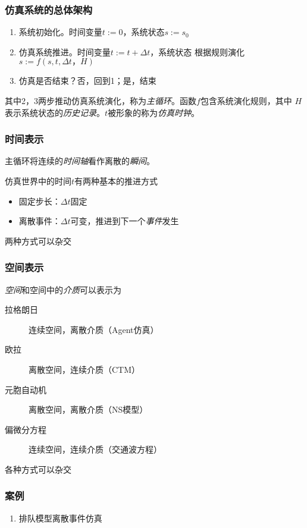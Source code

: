 \documentclass[14pt]{beamer}
\begin{document}
\begin{frame}
    \frametitle{仿真系统的总体架构}
    \begin{enumerate}
        \item 系统初始化。时间变量$t:=0$，系统状态$s:=s_0$
        \item 仿真系统推进。时间变量$t:=t+\Delta t$，系统状态
        根据规则演化$s:=f(s,t,\Delta t，H)$
        \item 仿真是否结束？否，回到1；是，结束
    \end{enumerate}

    其中2，3两步推动仿真系统演化，称为\emph{主循环}。函数$f$包含系统演化规则，其中
    $H$表示系统状态的\emph{历史记录}。$t$被形象的称为\emph{仿真时钟}。
\end{frame}

\begin{frame}
    \frametitle{时间表示}
    主循环将连续的\emph{时间轴}看作离散的\emph{瞬间}。

    仿真世界中的时间$t$有两种基本的推进方式
    \begin{itemize}
        \item 固定步长：$\Delta t$固定
        \item 离散事件：$\Delta t$可变，推进到下一个\emph{事件}发生
    \end{itemize}
    两种方式可以杂交

\end{frame}

\begin{frame}
    \frametitle{空间表示}
    \emph{空间}和空间中的\emph{介质}可以表示为
    \begin{description}
        \item[拉格朗日] 连续空间，离散介质（Agent仿真）
        \item[欧拉] 离散空间，连续介质（CTM）
        \item[元胞自动机] 离散空间，离散介质（NS模型）
        \item[偏微分方程] 连续空间，连续介质（交通波方程）
    \end{description}
    各种方式可以杂交
\end{frame}

\begin{frame}
    \frametitle{案例}
    \begin{enumerate}
        \item 排队模型离散事件仿真
    \end{enumerate}
\end{frame}
\end{document}
